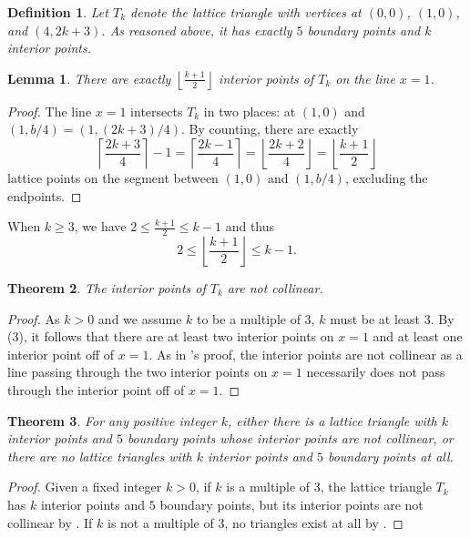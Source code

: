 \documentclass{article}
\theoremstyle{mydefstyle}
\newtheorem{theorem}{Theorem}
\newtheorem*{definition}{Definition}
\newtheorem{lemma}[theorem]{Lemma}
\begin{document}
\begin{definition}
Let $T_k$ denote the lattice triangle with vertices at $(0,0)$, $(1,0)$, and $(4,2k+3)$. As reasoned above, it has exactly $5$ boundary points and $k$ interior points. 
\end{definition}

\begin{lemma}
There are exactly $\left\lfloor\frac{k+1}2\right\rfloor$ interior points of $T_k$ on the line $x=1$. 
\end{lemma}

\begin{proof}
The line $x=1$ intersects $T_k$ in two places: at $(1,0)$ and $(1,b/4)=(1,(2k+3)/4)$. By counting, there are exactly \[\left\lceil\frac{2k+3}4\right\rceil-1=\left\lceil\frac{2k-1}4\right\rceil=\left\lfloor\frac{2k+2}4\right\rfloor=\left\lfloor\frac{k+1}2\right\rfloor\] lattice points on the segment between $(1,0)$ and $(1,b/4)$, excluding the endpoints. 
\end{proof}

When $k\ge3$, we have $2\le\frac{k+1}2\le k-1$ and thus \begin{equation}2\le\left\lfloor\frac{k+1}2\right\rfloor\le k-1.\end{equation}

\begin{theorem}
\label{tknocol:label}
The interior points of $T_k$ are not collinear. 
\end{theorem}

\begin{proof}
As $k>0$ and we assume $k$ to be a multiple of $3$, $k$ must be at least $3$. By (3), it follows that there are at least two interior points on $x=1$ and at least one interior point off of $x=1$. As in 's proof, the interior points are not collinear as a line passing through the two interior points on $x=1$ necessarily does not pass through the interior point off of $x=1$. 
\end{proof}

\begin{theorem}
For any positive integer $k$, either there is a lattice triangle with $k$ interior points and $5$ boundary points whose interior points are not collinear, or there are no lattice triangles with $k$ interior points and $5$ boundary points at all. 
\end{theorem}

\begin{proof}
Given a fixed integer $k>0$, if $k$ is a multiple of $3$, the lattice triangle $T_k$ has $k$ interior points and $5$ boundary points, but its interior points are not collinear by . If $k$ is not a multiple of $3$, no triangles exist at all by . 
\end{proof}
\end{document}
